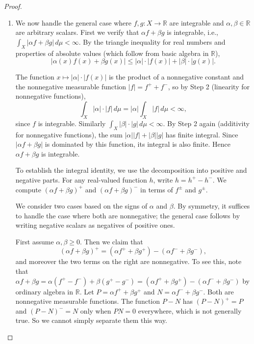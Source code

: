 \begin{proof}
\begin{enumerate}
    Taking limits in the identity from Step 1:
    $$\int_X (\alpha f + \beta g)\,d\mu = \lim_{n\to\infty} \int_X (\alpha s_n + \beta t_n)\,d\mu = \lim_{n\to\infty}\left(\alpha \int_X s_n\,d\mu + \beta \int_X t_n\,d\mu\right).$$

    Since $\alpha,\beta \geq 0$, this equals
    $$\alpha \cdot \lim_{n\to\infty} \int_X s_n\,d\mu + \beta \cdot \lim_{n\to\infty} \int_X t_n\,d\mu = \alpha \int_X f\,d\mu + \beta \int_X g\,d\mu,$$
    where the limit of a sum equals the sum of limits (with the convention that $+\infty + c = +\infty$ for any nonnegative real or infinite value). This establishes linearity for nonnegative measurable functions with nonnegative coefficients.

    \item We now handle the general case where $f,g : X \to \mathbb{R}$ are integrable and $\alpha,\beta \in \mathbb{R}$ are arbitrary scalars. First we verify that $\alpha f + \beta g$ is integrable, i.e., $\int_X |\alpha f + \beta g|\,d\mu < \infty$. By the triangle inequality for real numbers and properties of absolute values (which follow from basic algebra in $\mathbb{R}$),
    $$|\alpha(x) f(x) + \beta g(x)| \leq |\alpha| \cdot |f(x)| + |\beta| \cdot |g(x)|.$$

    The function $x \mapsto |\alpha| \cdot |f(x)|$ is the product of a nonnegative constant and the nonnegative measurable function $|f| = f^+ + f^-$, so by Step 2 (linearity for nonnegative functions),
    $$\int_X |\alpha|\cdot |f|\,d\mu = |\alpha| \int_X |f|\,d\mu < \infty,$$
    since $f$ is integrable. Similarly $\int_X |\beta|\cdot |g|\,d\mu < \infty$. By Step 2 again (additivity for nonnegative functions), the sum $|\alpha||f| + |\beta||g|$ has finite integral. Since $|\alpha f + \beta g|$ is dominated by this function, its integral is also finite. Hence $\alpha f + \beta g$ is integrable.

    To establish the integral identity, we use the decomposition into positive and negative parts. For any real-valued function $h$, write $h = h^+ - h^-$. We compute $(\alpha f + \beta g)^+$ and $(\alpha f + \beta g)^-$ in terms of $f^\pm$ and $g^\pm$.

    We consider two cases based on the signs of $\alpha$ and $\beta$. By symmetry, it suffices to handle the case where both are nonnegative; the general case follows by writing negative scalars as negatives of positive ones.

    First assume $\alpha,\beta \geq 0$. Then we claim that $$(\alpha f + \beta g)^+ = (\alpha f^+ + \beta g^+) - (\alpha f^- + \beta g^-),$$ and moreover the two terms on the right are nonnegative. To see this, note that $\alpha f + \beta g = \alpha(f^+ - f^-) + \beta(g^+ - g^-) = (\alpha f^+ + \beta g^+) - (\alpha f^- + \beta g^-)$ by ordinary algebra in $\mathbb{R}$. Let $P = \alpha f^+ + \beta g^+$ and $N = \alpha f^- + \beta g^-$. Both are nonnegative measurable functions. The function $P - N$ has $(P-N)^+ = P$ and $(P-N)^- = N$ only when $PN = 0$ everywhere, which is not generally true. So we cannot simply separate them this way.


\end{enumerate}
\end{proof}
